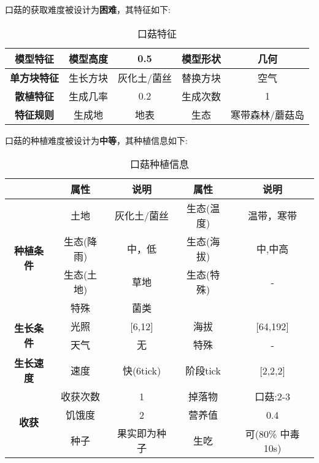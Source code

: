 口菇的获取难度被设计为\textbf{困难}，其特征如下:
\begin{table}[H]
    \centering
    \caption{口菇特征}
    \label{table:口菇特征}
    \setlength{\tabcolsep}{4mm}
    \begin{tabular}{c|cc|cc}
        \toprule
        \textbf{模型特征}   & 模型高度 & 0.5      & 模型形状 & 几何     \\
        \midrule
        \textbf{单方块特征} & 生长方块 & 灰化土/菌丝 & 替换方块 & 空气     \\
        \midrule
        \textbf{散植特征}   & 生成几率 & 0.2   & 生成次数 & 1        \\
        \midrule
        \textbf{特征规则}   & 生成地   & 地表   & 生态     & 寒带森林/蘑菇岛 \\
        \bottomrule
    \end{tabular}
\end{table}


口菇的种植难度被设计为\textbf{中等}，其种植信息如下:

\begin{table}[H]
    \centering
    \caption{口菇种植信息}
    \label{table:口菇种植信息}
    \setlength{\tabcolsep}{4mm}
    \begin{tabular}{c|cc|cc}
        \toprule
                                           & \textbf{属性} & \textbf{说明} & \textbf{属性} & \textbf{说明} \\
        \midrule
        \multirow{4}{*}{\textbf{种植条件}} & 土地          & 灰化土/菌丝          & 生态(温度)    & 温带，寒带    \\
                                           & 生态(降雨)    & 中，低        & 生态(海拔)    & 中,中高            \\
                                           & 生态(土地)    & 草地          & 生态(特殊)    & -             \\
                                           & 特殊          & 菌类           \\
        \midrule
        \multirow{2}{*}{\textbf{生长条件}} & 光照          & [6,12]        & 海拔          & [64,192]      \\
                                           & 天气          & 无            & 特殊          & -             \\
        \midrule
        \textbf{生长速度}                  & 速度          & 快(6tick)     & 阶段tick      & [2,2,2]       \\
        \midrule
        \multirow{3}{*}{\textbf{收获}}     & 收获次数      & 1             & 掉落物        & 口菇:2-3      \\
                                           & 饥饿度        & 2             & 营养值        & 0.4           \\
                                           & 种子          & 果实即为种子  & 生吃          & 可(80\% 中毒 10s)   \\
        \bottomrule
    \end{tabular}
\end{table}


